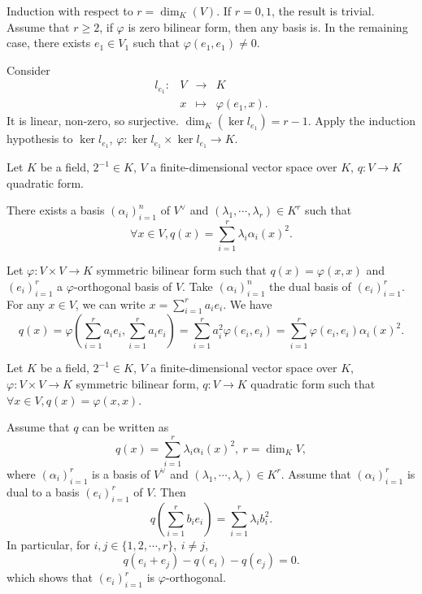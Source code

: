 \begin{proofenv}
    Induction with respect to $r = \dim_{K}(V)$. If $r=0,1$, the result is trivial. Assume that $r \ge 2$, if $\varphi$ is zero bilinear form, then any basis is. In the remaining case, there exists $e_1\in V_1$ such that $\varphi(e_1,e_1) \neq 0$.
    
    Consider
    $$\begin{array}{rrcl}
        l_{e_1} : & V& \rightarrow & K\\ & x &\mapsto &\varphi(e_1,x).
    \end{array}$$
    It is linear, non-zero, so surjective. $\dim_{K}\left(\ker l_{e_1}\right) = r- 1 $. Apply the induction hypothesis to $\ker l_{e_1}$, $\varphi : \ker l_{e_1} \times \ker l_{e_1} \rightarrow K$.
\end{proofenv}
\begin{propositionenv}
    Let $K$ be a field, $2^{-1}\in K$, $V$ a finite-dimensional vector space over $K$, $q: V\rightarrow K$ quadratic form.

    \quad There exists a basis $\left(\alpha_i\right)_{i=1}^{n}$ of $V^\vee$ and $\left(\lambda_1,\cdots,\lambda_r\right)\in K^r$ such that
    $$ \forall x\in V, q(x) = \sum_{i=1}^{r} \lambda_i \alpha_i(x)^2.$$
\end{propositionenv}
\begin{proofenv}
    Let $\varphi : V\times V\rightarrow K$ symmetric bilinear form such that $q(x) = \varphi(x,x)$ and $\left(e_i\right)_{i=1}^{r}$ a $\varphi$-orthogonal basis of $V$.
    Take $\left(\alpha_i\right)_{i=1}^{n}$ the dual basis of $\left(e_i\right)_{i=1}^{r}$. 
    For any $x\in V$, we can write $x = \sum_{i=1}^{r} a_i e_i$. We have
    $$ q(x) = \varphi\left(\sum_{i=1}^{r} a_i e_i, \sum_{i=1}^{r} a_i e_i\right) = \sum_{i=1}^{r} a_i^2 \varphi(e_i,e_i) = \sum_{i=1}^{r} \varphi(e_i,e_i) \alpha_i(x)^2.$$
\end{proofenv}
\begin{remark}
    Let $K$ be a field, $2^{-1}\in K$, $V$ a finite-dimensional vector space over $K$, $\varphi : V\times V\rightarrow K$ symmetric bilinear form, $q: V\rightarrow K$ quadratic form such that $\forall x\in V, q(x) = \varphi(x,x)$.

    \quad Assume that $q$ can be written as 
    $$ q(x) = \sum_{i=1}^{r} \lambda_i \alpha_i(x)^2,\ r =\dim_{K}V,$$
    where $\left(\alpha_i\right)_{i=1}^{r}$ is a basis of $V^\vee$ and $\left(\lambda_1,\cdots,\lambda_r\right)\in K^r$. 
    Assume that $\left(\alpha_i\right)_{i=1}^{r}$ is dual to a basis $\left(e_i\right)_{i=1}^{r}$ of $V$.
    Then 
    $$ q \left(\sum_{i=1}^{r} b_i e_i\right) = \sum_{i=1}^{r} \lambda_i b_i^2. $$
    In particular, for $i,j \in \{1,2,\cdots,r\},\ i\neq j$,
    $$ q(e_i + e_j) - q(e_i) - q(e_j) = 0.$$
    which shows that $\left(e_i\right)_{i=1}^{r}$ is $\varphi$-orthogonal.
\end{remark}
